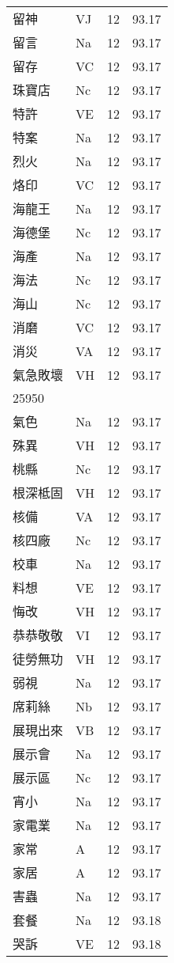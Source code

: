 \documentclass[twocolumn]{book}
\begin{document}
\begin{supertabular}{llrr}
留神 & VJ & 12 &  93.17\\
留言 & Na & 12 &  93.17\\
留存 & VC & 12 &  93.17\\
珠寶店 & Nc & 12 &  93.17\\
特許 & VE & 12 &  93.17\\
特案 & Na & 12 &  93.17\\
烈火 & Na & 12 &  93.17\\
烙印 & VC & 12 &  93.17\\
海龍王 & Na & 12 &  93.17\\
海德堡 & Nc & 12 &  93.17\\
海產 & Na & 12 &  93.17\\
海法 & Nc & 12 &  93.17\\
海山 & Nc & 12 &  93.17\\
消磨 & VC & 12 &  93.17\\
消災 & VA & 12 &  93.17\\
氣急敗壞 & VH & 12 &  93.17\\
25950\\
氣色 & Na & 12 &  93.17\\
殊異 & VH & 12 &  93.17\\
桃縣 & Nc & 12 &  93.17\\
根深柢固 & VH & 12 &  93.17\\
核備 & VA & 12 &  93.17\\
核四廠 & Nc & 12 &  93.17\\
校車 & Na & 12 &  93.17\\
料想 & VE & 12 &  93.17\\
悔改 & VH & 12 &  93.17\\
恭恭敬敬 & VI & 12 &  93.17\\
徒勞無功 & VH & 12 &  93.17\\
弱視 & Na & 12 &  93.17\\
席莉絲 & Nb & 12 &  93.17\\
展現出來 & VB & 12 &  93.17\\
展示會 & Na & 12 &  93.17\\
展示區 & Nc & 12 &  93.17\\
宵小 & Na & 12 &  93.17\\
家電業 & Na & 12 &  93.17\\
家常 & A & 12 &  93.17\\
家居 & A & 12 &  93.17\\
害蟲 & Na & 12 &  93.17\\
套餐 & Na & 12 &  93.18\\
哭訴 & VE & 12 &  93.18\\

\end{supertabular}
\end{document}

